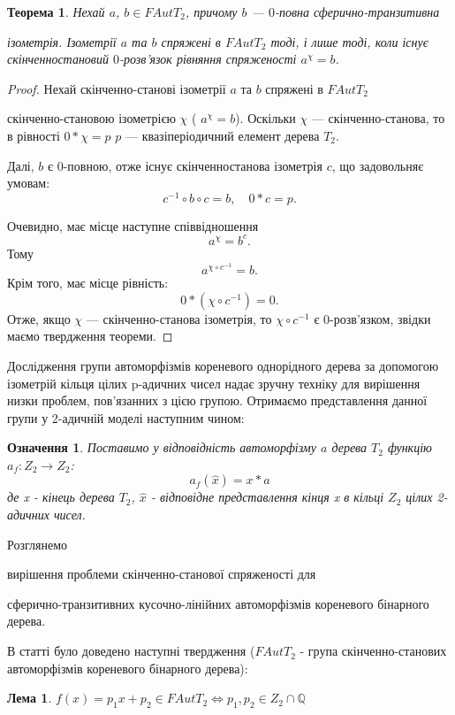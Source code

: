 \documentclass[a4paper,12pt]{article} \usepackage{a4wide}
\numberwithin{equation}{subsection}
\newtheorem{theorem}{Теорема}[subsection]
\newtheorem{lemma}{Лема}[subsection]
\newtheorem{definition}{Означення}[subsection]
\begin{document}
\begin{theorem}\label{null_root_theorem}
Нехай $a$, $b \in FAutT_2$, причому $b$ --- $0$-повна сферично-транзитивна

  ізометрія. Ізометрії $a$ та $b$ спряжені в
  $FAutT_2$ тоді, і лише тоді, коли існує скінченностановий
  $0$-розв'язок рівняння спряженості $a^\chi=b$.
\end{theorem}
\begin{proof}
  Нехай скінченно-станові ізометрії $a$ та $b$ спряжені в $FAutT_2$


  скінченно-становою ізометрією $\chi$ ( $a^{\chi} = b$). Оскільки $\chi$ ---
  скінченно-станова, то в рівності $0*\chi = p$ $p$ --- квазіперіодичний
  елемент дерева $T_2$.

Далі,  $b$ є $0$-повною, отже існує скінченностанова ізометрія $c$, що задовольняє умовам:
$$ c^{-1}\circ b \circ c = b, \quad 0*c = p. $$

Очевидно, має місце наступне співвідношення
$$a^\chi=b^c.$$
Тому $$a^{\chi\circ c^{-1}}=b.$$
Крім того, має місце рівність:
$$0*(\chi\circ c^{-1}) = 0.$$
Отже, якщо $\chi$ --- скінченно-станова ізометрія, то $\chi\circ c^{-1}$
є $0$-розв'язком, звідки маємо твердження теореми.
\end{proof}

Дослідження групи автоморфізмів кореневого однорідного дерева за
допомогою ізометрій кільця цілих p-адичних чисел надає зручну техніку
для вирішення низки проблем, пов'язанних з цією групою. Отримаємо представлення данної групи у 2-адичній моделі наступним чином:
\begin{definition}
 Поставимо у відповідність автоморфізму $a$ дерева $T_2$ функцію $a_f:Z_2\rightarrow Z_2$:
$$a_f(\hat{x})=x*a$$ де x - кінець дерева $T_2$, $\hat{x}$ - відповідне представлення кінця x в кільці  $Z_2$ цілих 2-адичних чисел. 
\end{definition}

 Розглянемо

вирішення проблеми скінченно-станової спряженості для


 сферично-транзитивних кусочно-лінійних
  автоморфізмів кореневого бінарного дерева.

В статті \cite{M_1} було доведено наступні твердження ($FAutT_2$ - група скінченно-станових автоморфізмів кореневого бінарного дерева):
\begin{lemma}\label{ficen3} 
  $f(x)=p_1x+p_2 \in FAutT_2 \Leftrightarrow p_1,p_2 \in
  Z_2\cap\mathbb{Q} $
\end{lemma}
\end{document}
